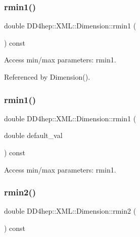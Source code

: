 \subsubsection{\texorpdfstring{rmin1()}{rmin1()}\hspace{0.1cm}{\footnotesize\ttfamily [1/2]}}
{\footnotesize\ttfamily double D\+D4hep\+::\+X\+M\+L\+::\+Dimension\+::rmin1 (\begin{DoxyParamCaption}{ }\end{DoxyParamCaption}) const}



Access min/max parameters\+: rmin1. 



Referenced by Dimension().

\hypertarget{struct_d_d4hep_1_1_x_m_l_1_1_dimension_a5f32fce071d6e845d6df8ff8b3235542}{}\label{struct_d_d4hep_1_1_x_m_l_1_1_dimension_a5f32fce071d6e845d6df8ff8b3235542} 
\subsubsection{\texorpdfstring{rmin1()}{rmin1()}\hspace{0.1cm}{\footnotesize\ttfamily [2/2]}}
{\footnotesize\ttfamily double D\+D4hep\+::\+X\+M\+L\+::\+Dimension\+::rmin1 (\begin{DoxyParamCaption}\item[{double}]{default\+\_\+val }\end{DoxyParamCaption}) const}



Access min/max parameters\+: rmin1. 

\hypertarget{struct_d_d4hep_1_1_x_m_l_1_1_dimension_a32157c205bff81aedbdb81bdca08e615}{}\label{struct_d_d4hep_1_1_x_m_l_1_1_dimension_a32157c205bff81aedbdb81bdca08e615} 
\subsubsection{\texorpdfstring{rmin2()}{rmin2()}\hspace{0.1cm}{\footnotesize\ttfamily [1/2]}}
{\footnotesize\ttfamily double D\+D4hep\+::\+X\+M\+L\+::\+Dimension\+::rmin2 (\begin{DoxyParamCaption}{ }\end{DoxyParamCaption}) const}



